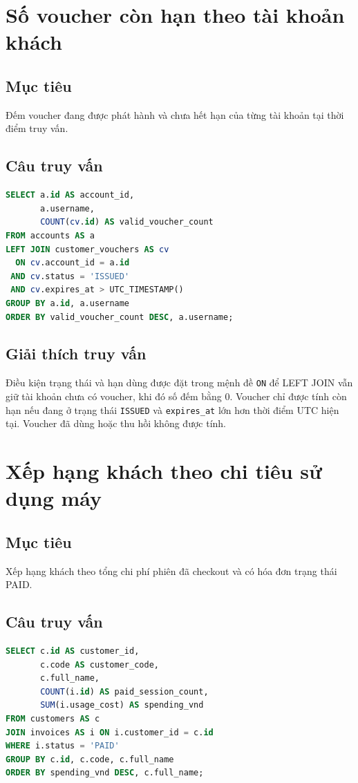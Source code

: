 \section{Số voucher còn hạn theo tài khoản khách}
\subsection*{Mục tiêu}
Đếm voucher đang được phát hành và chưa hết hạn của từng tài khoản tại thời điểm truy vấn.

\subsection*{Câu truy vấn}
\begin{lstlisting}[language=SQL]
SELECT a.id AS account_id,
       a.username,
       COUNT(cv.id) AS valid_voucher_count
FROM accounts AS a
LEFT JOIN customer_vouchers AS cv
  ON cv.account_id = a.id
 AND cv.status = 'ISSUED'
 AND cv.expires_at > UTC_TIMESTAMP()
GROUP BY a.id, a.username
ORDER BY valid_voucher_count DESC, a.username;
\end{lstlisting}

\subsection*{Giải thích truy vấn}
Điều kiện trạng thái và hạn dùng được đặt trong mệnh đề \texttt{ON} để LEFT JOIN vẫn giữ tài khoản chưa có voucher, khi đó số đếm bằng 0. Voucher chỉ được tính còn hạn nếu đang ở trạng thái \texttt{ISSUED} và \texttt{expires\_at} lớn hơn thời điểm UTC hiện tại. Voucher đã dùng hoặc thu hồi không được tính.

\section{Xếp hạng khách theo chi tiêu sử dụng máy}
\subsection*{Mục tiêu}
Xếp hạng khách theo tổng chi phí phiên đã checkout và có hóa đơn trạng thái PAID.

\subsection*{Câu truy vấn}
\begin{lstlisting}[language=SQL]
SELECT c.id AS customer_id,
       c.code AS customer_code,
       c.full_name,
       COUNT(i.id) AS paid_session_count,
       SUM(i.usage_cost) AS spending_vnd
FROM customers AS c
JOIN invoices AS i ON i.customer_id = c.id
WHERE i.status = 'PAID'
GROUP BY c.id, c.code, c.full_name
ORDER BY spending_vnd DESC, c.full_name;
\end{lstlisting}

